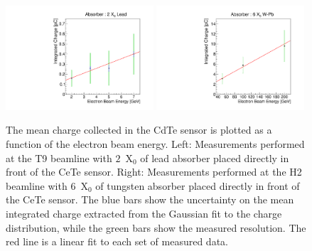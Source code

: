 \begin{figure}[htbp] 
\centering
\includegraphics[width=0.49\textwidth]{figures/ChargeVsEnergyAt2X0.pdf} 
\includegraphics[width=0.49\textwidth]{figures/ChargeVsEnergyAt6X0.pdf} 
\caption{ The mean charge collected in the CdTe sensor is plotted as a function
of the electron beam energy. Left: Measurements performed at the T9 beamline
with $2$~$\mathrm{X}_{0}$ of lead absorber placed directly in front of the 
CeTe sensor. Right: Measurements performed at the H2 beamline
with $6$~$\mathrm{X}_{0}$ of tungsten absorber placed directly in front of the 
CeTe sensor. The blue bars show the uncertainty on the mean integrated charge
extracted from the Gaussian fit to the charge distribution, while the green 
bars show the measured resolution. The red line is a 
linear fit to each set of measured data. } 
\label{fig:ChargeVsEnergy} 
\end{figure} 


